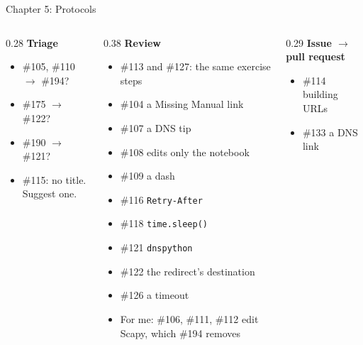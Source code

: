 \documentclass[9pt,aspectratio=169]{beamer}
\begin{document}
\begin{frame}{Chapter 5: Protocols}
    \begin{columns}[T]
        \begin{column}{0.28\textwidth}
            \textbf{Triage}
            \begin{itemize}\small
                \item \#105, \#110 $\to$ \#194?
                \item \#175 $\to$ \#122?
                \item \#190 $\to$ \#121?
                \item \#115: no title. Suggest one.
            \end{itemize}
        \end{column}
        \begin{column}{0.38\textwidth}
            \textbf{Review}
            \begin{itemize}\small
                \item \#113 and \#127: the same exercise steps
                \item \#104 a Missing Manual link
                \item \#107 a DNS tip
                \item \#108 edits only the notebook
                \item \#109 a dash
                \item \#116 \texttt{Retry-After}
                \item \#118 \texttt{time.sleep()}
                \item \#121 \texttt{dnspython}
                \item \#122 the redirect's destination
                \item \#126 a timeout
                \item For me: \#106, \#111, \#112 edit Scapy, which \#194 removes
            \end{itemize}
        \end{column}
        \begin{column}{0.29\textwidth}
            \textbf{Issue $\to$ pull request}
            \begin{itemize}\small
                \item \#114 building URLs
                \item \#133 a DNS link
            \end{itemize}
        \end{column}
    \end{columns}
\end{frame}
\end{document}
